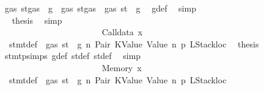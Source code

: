 \begin{isabellebody}
\ {\isachardoublequoteopen}gas\ {\isacharparenleft}{\kern0pt}st{\isacharprime}{\kern0pt}{\isasymlparr}gas\ {\isacharcolon}{\kern0pt}{\isacharequal}{\kern0pt}\ g{\isacharprime}{\kern0pt}{\isasymrparr}{\isacharparenright}{\kern0pt}\ {\isasymle}\ gas\ {\isacharparenleft}{\kern0pt}st{\isasymlparr}gas\ {\isacharcolon}{\kern0pt}{\isacharequal}{\kern0pt}\ gas\ st\ {\isacharminus}{\kern0pt}\ g{\isasymrparr}{\isacharparenright}{\kern0pt}{\isachardoublequoteclose}\ \isamarkupfalse%
\ g{\isacharunderscore}{\kern0pt}def\ \isamarkupfalse%
\ simp\isanewline
\ \ \ \ \ \ \ \ \ \ \ \ \ \ \ \ \ \ \ \ \ \ \ \ \isamarkupfalse%
\ \isamarkupfalse%
\ {\isacharquery}{\kern0pt}thesis\ \isamarkupfalse%
\ simp\isanewline
\ \ \ \ \ \ \ \ \ \ \ \ \ \ \ \ \ \ \ \ \ \ \isamarkupfalse%
\isanewline
\ \ \ \ \ \ \ \ \ \ \ \ \ \ \ \ \ \ \ \ \isamarkupfalse%
\isanewline
\ \ \ \ \ \ \ \ \ \ \ \ \ \ \ \ \ \ \ \ \ \ \isamarkupfalse%
\ {\isacharparenleft}{\kern0pt}Calldata\ x{}{\isacharparenright}{\kern0pt}\isanewline
\ \ \ \ \ \ \ \ \ \ \ \ \ \ \ \ \ \ \ \ \ \ \isamarkupfalse%
\ {}{\isacharparenleft}{\kern0pt}{}{\isacharparenright}{\kern0pt}\ stmt{\isacharunderscore}{\kern0pt}def\ {\isacharbackquoteopen}{\isasymnot}\ gas\ st\ {\isasymle}\ g{\isacharbackquoteclose}\ n\ Pair\ KValue\ Value\ n{}\ p{}\ LStackloc\ \isamarkupfalse%
\ {\isacharquery}{\kern0pt}thesis\ \isamarkupfalse%
\ stmt{\isachardot}{\kern0pt}psimps{\isacharparenleft}{\kern0pt}{}{\isacharparenright}{\kern0pt}\ g{\isacharunderscore}{\kern0pt}def\ st{\isacharprime}{\kern0pt}{\isacharunderscore}{\kern0pt}def\ st{\isacharprime}{\kern0pt}{\isacharprime}{\kern0pt}{\isacharunderscore}{\kern0pt}def\ \isamarkupfalse%
\ simp\isanewline
\ \ \ \ \ \ \ \ \ \ \ \ \ \ \ \ \ \ \ \ \isamarkupfalse%
\isanewline
\ \ \ \ \ \ \ \ \ \ \ \ \ \ \ \ \ \ \ \ \ \ \isamarkupfalse%
\ {\isacharparenleft}{\kern0pt}Memory\ x{}{\isacharparenright}{\kern0pt}\isanewline
\ \ \ \ \ \ \ \ \ \ \ \ \ \ \ \ \ \ \ \ \ \ \isamarkupfalse%
\ {}{\isacharparenleft}{\kern0pt}{}{\isacharparenright}{\kern0pt}\ stmt{\isacharunderscore}{\kern0pt}def\ {\isacharbackquoteopen}{\isasymnot}\ gas\ st\ {\isasymle}\ g{\isacharbackquoteclose}\ n\ Pair\ KValue\ Value\ n{}\ p{}\ LStackloc\ \isamarkupfalse%

\end{isabellebody}
